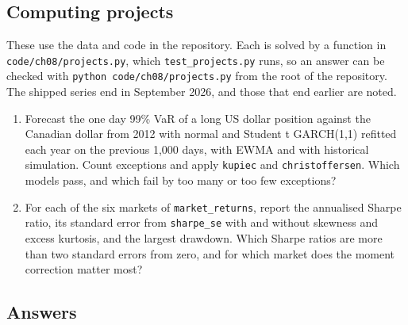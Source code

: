 \begin{chapterrefs}
\subsection*{Computing projects}
\label{sec8:projects}
These use the data and code in the repository. Each is solved by a function in
\texttt{code/ch08/projects.py}, which \texttt{test\_projects.py} runs, so an answer can be
checked with \texttt{python code/ch08/projects.py} from the root of the repository. The
shipped series end in September 2026, and those that end earlier are noted.

\begin{enumerate}[label=\textbf{P8.\arabic*}, leftmargin=*, ref=P8.\arabic*]
\item Forecast the one day 99\% VaR of a long US dollar position against the Canadian dollar from 2012 with
normal and Student t GARCH(1,1) refitted each year on the previous 1,000 days, with EWMA and with
historical simulation. Count exceptions and apply \texttt{kupiec} and \texttt{christoffersen}. Which models
pass, and which fail by too many or too few exceptions?
\item For each of the six markets of \texttt{market\_returns}, report the annualised Sharpe ratio, its standard
error from \texttt{sharpe\_se} with and without skewness and excess kurtosis, and the largest drawdown.
Which Sharpe ratios are more than two standard errors from zero, and for which market does the moment
correction matter most?
\end{enumerate}

\subsection*{Answers}


\end{chapterrefs}
